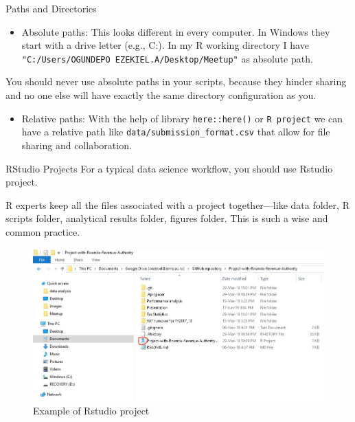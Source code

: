 \documentclass[
  ignorenonframetext,
]{beamer}
\providecommand{\tightlist}{%
  \setlength{\itemsep}{0pt}\setlength{\parskip}{0pt}}
\begin{document}
\begin{frame}[fragile]{Paths and Directories}
\protect\hypertarget{paths-and-directories}{}
\pause
\begin{itemize}
\tightlist
\item
  Absolute paths: This looks different in every computer. In Windows
  they start with a drive letter (e.g., C:). In my R working directory I
  have \texttt{"C:/Users/OGUNDEPO\ EZEKIEL.A/Desktop/Meetup"} as
  absolute path.
\end{itemize}
\pause
You should never use absolute paths in your scripts, because they hinder
sharing and no one else will have exactly the same directory
configuration as you.
\pause
\begin{itemize}
\tightlist
\item
  Relative paths: With the help of library \texttt{here::here()} or
  \texttt{R\ project} we can have a relative path like
  \texttt{data/submission\_format.csv} that allow for file sharing and
  collaboration.
\end{itemize}

\end{frame}

\begin{frame}{RStudio Projects}
\protect\hypertarget{rstudio-projects}{}
\pause
For a typical data science workflow, you should use Rstudio project.

R experts keep all the files associated with a project together---like
data folder, R scripts folder, analytical results folder, figures
folder. This is such a wise and common practice.

\end{frame}

\begin{frame}{}
\protect\hypertarget{section-2}{}

\begin{figure}
\centering
\includegraphics{Images/R project.JPG}
\caption{Example of Rstudio project}
\end{figure}

\end{frame}
\end{document}
